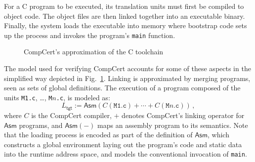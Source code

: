 \documentclass[sigplan,10pt,review,anonymous]{acmart}\settopmatter{printfolios=true,printccs=false,printacmref=false}
\newcommand{\kw}[1]{\ensuremath{ \mathsf{#1} }}
\begin{document}
For a C program to be executed,
its translation units must first be compiled to object code.
The object files are then linked together
into an executable binary.
Finally, the system loads the executable into memory
where bootstrap code sets up the process
and invokes the program's \texttt{main} function.

\begin{figure} %
    \caption{CompCert's approximation of the C toolchain}
    \label{fig:process}
\end{figure}

The model used for verifying CompCert accounts for
some of these aspects in the simplified way
depicted in Fig.~\ref{fig:process}.
Linking is approximated by
merging programs, seen as sets of global definitions.
The execution
of a program composed of the units
\texttt{M1.c}, \ldots, \texttt{M$n$.c},
is modeled as:
\[
    L_\kw{tgt} :=
    \kw{Asm}(C(\texttt{M1.c}) +
             \cdots +
             C(\texttt{M$n$.c})) \,,
\]
where $C$ is the CompCert compiler,
$+$ denotes CompCert's linking operator for \kw{Asm} programs, and
$\kw{Asm}(-)$ maps an assembly program to its semantics.
Note that the loading process is encoded
as part of the definition of $\kw{Asm}$,
which constructs a global environment
laying out the program's code and static data
into the runtime address space,
and models the conventional invocation of \texttt{main}.
\end{document}
